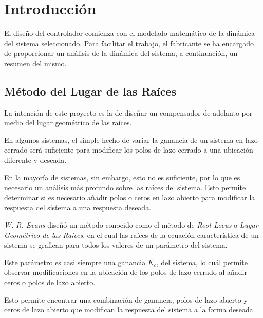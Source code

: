 \documentclass[12pt,a4paper]{article}
\begin{document}
	\pagebreak 

  \tableofcontents
  \pagebreak 

	
	\pagebreak

	  \section{Introducción} \label{sec:intro}
	
      El diseño del controlador comienza con el modelado matemático de la dinámica del sistema seleccionado. Para 
      facilitar el trabajo, el fabricante se ha encargado de proporcionar un análisis de la dinámica del sistema, 
      a continuación, un resumen del mismo. 

      \subsection{Método del Lugar de las Raíces}

        La intención de este proyecto es la de diseñar un compensador de adelanto por medio del lugar geométrico de las 
        raíces. 

        En algunos sistemas, el simple hecho de variar la ganancia de un sistema en lazo cerrado será suficiente para 
        modificar los polos de lazo cerrado a una ubicación diferente y deseada. 
        
        En la mayoría de sistemas, sin embargo, esto no es suficiente, por lo que es necesario un análisis más profundo 
        sobre las raíces del sistema. Esto permite determinar si es necesario añadir polos o ceros en lazo abierto
        para modificar la respuesta del sistema a una respuesta deseada. 

        \emph{W. R. Evans} diseñó un método conocido como el método de \emph{Root Locus} o
        \emph{Lugar Geométrico de las Raíces}, en el cual las raíces de la ecuación característica de un sistema
        se grafican para todos los valores de un parámetro del sistema. 

        Este parámetro es casi siempre una ganancia \( K_{c} \), del sistema, lo cuál permite observar modificaciones 
        en la ubicación de los polos de lazo cerrado al añadir ceros o polos de lazo abierto. 

        Esto permite encontrar una combinación de ganancia, polos de lazo abierto y ceros de lazo abierto que 
        modifican la respuesta del sistema a la forma deseada. 
\end{document}
